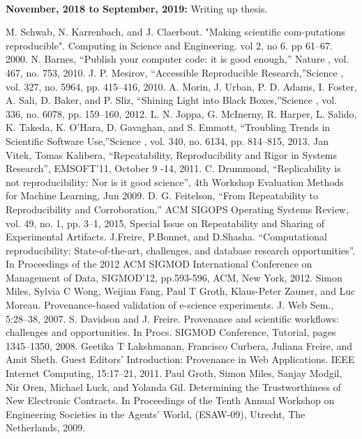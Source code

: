 \documentclass[6pt,,a4paper]{article}
\begin{document}
\\
\break \textbf{November, 2018 to September, 2019: }
Writing up thesis.
\begin{thebibliography}{12}
  M. Schwab, N. Karrenbach, and J. Claerbout. "Making scientific com-putations  reproducible". Computing  in  Science  and  Engineering. vol  2, no 6. pp 61–67. 2000. 
 N. Barnes, “Publish your computer code: it is good enough,” Nature , vol. 467, no. 753, 2010. 
 J. P. Mesirov, “Accessible Reproducible Research,”Science , vol. 327, no. 5964, pp. 415–416, 2010.
 A. Morin, J. Urban, P. D. Adams, I. Foster, A. Sali, D. Baker, and P. Sliz, “Shining Light into Black Boxes,”Science , vol. 336, no. 6078, pp. 159–160, 2012. 
 L. N. Joppa, G. McInerny, R. Harper, L. Salido, K. Takeda, K. O’Hara, D. Gavaghan, and S. Emmott, “Troubling Trends in Scientific Software Use,”Science , vol. 340, no. 6134, pp. 814–815, 2013.
 Jan Vitek, Tomas Kalibera, “Repeatability, Reproducibility and Rigor in Systems Research”, EMSOFT’11, October 9 -14, 2011.
 C. Drummond, “Replicability is not reproducibility: Nor is it good science”, 4th Workshop Evaluation Methods for Machine Learning, Jun 2009.
 D. G. Feitelson, “From Repeatability to Reproducibility and Corroboration,” ACM SIGOPS Operating Systems Review, vol. 49, no. 1, pp. 3–1, 2015, Special Issue on Repeatability and Sharing of Experimental Artifacts.
J.Freire, P.Bonnet, and D.Shasha. “Computational reproducibility: State-of-the-art, challenges, and database research opportunities”. In Proceedings of the 2012 ACM SIGMOD International Conference on Management of Data, SIGMOD’12, pp.593-596, ACM, New York, 2012. 
 Simon Miles, Sylvia C Wong, Weijian Fang, Paul T Groth, Klaus-Peter Zauner, and Luc Moreau. Provenance-based validation of e-science experiments. J. Web Sem., 5:28–38, 2007.
 S. Davidson and J. Freire. Provenance and scientiﬁc workﬂows: challenges and opportunities. In Procs. SIGMOD Conference, Tutorial, pages 1345–1350, 2008.
 Geetika T Lakshmanan, Francisco Curbera, Juliana Freire, and Amit Sheth. Guest Editors’ Introduction: Provenance in Web Applications. IEEE Internet Computing, 15:17–21, 2011.
 Paul Groth, Simon Miles, Sanjay Modgil, Nir Oren, Michael Luck, and Yolanda Gil. Determining the Trustworthiness of New Electronic Contracts. In Proceedings of the Tenth Annual Workshop on Engineering Societies in the Agents’ World, (ESAW-09), Utrecht, The Netherlands, 2009.

\end{thebibliography}
\end{document}

